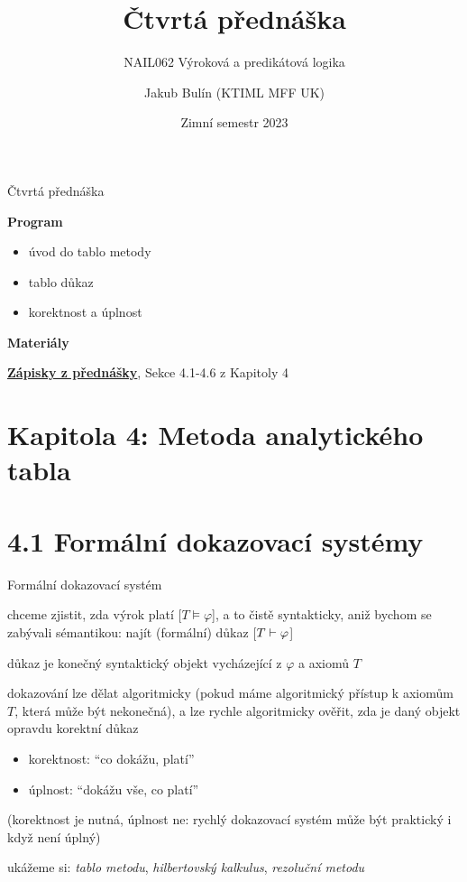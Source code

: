 \documentclass{beamer}
\title{Čtvrtá přednáška}
\subtitle{NAIL062 Výroková a predikátová logika}
\author{Jakub Bulín (KTIML MFF UK)}
\date{Zimní semestr 2023}
\begin{document}
\frame{\titlepage}


\begin{frame}{Čtvrtá přednáška}

    \textbf{Program}
        \begin{itemize}
            \item úvod do tablo metody
            \item tablo důkaz
            \item korektnost a úplnost
        \end{itemize}

    \textbf{Materiály}

        \href{https://github.com/jbulin-mff-uk/nail062/raw/main/lecture/lecture-notes/lecture-notes.pdf}{\alert{\textbf{Zápisky z přednášky}}}, Sekce 4.1-4.6 z Kapitoly 4

\end{frame}


\section{\sc Kapitola 4: Metoda analytického tabla}


\section{4.1 Formální dokazovací systémy}


\begin{frame}{Formální dokazovací systém}

    chceme zjistit, zda výrok platí [\alert{$T\models\varphi$}], a to čistě syntakticky, aniž bychom se zabývali sémantikou: najít \alert{(formální) důkaz} [\alert{$T\vdash\varphi$}]

    \alert{důkaz} je konečný syntaktický objekt vycházející z $\varphi$ a axiomů $T$

    dokazování lze dělat \alert{algoritmicky} (pokud máme algoritmický přístup k axiomům $T$, která může být nekonečná), a lze rychle algoritmicky \alert{ověřit}, zda je daný objekt opravdu korektní důkaz

    \begin{itemize}
        \item \alert{korektnost}: ``co dokážu, platí'' \hfill {}
        \item \alert{úplnost}: ``dokážu vše, co platí'' \hfill {}
    \end{itemize}
    (korektnost je nutná, úplnost ne: rychlý dokazovací systém může být praktický i když není úplný)

    ukážeme si: \emph{tablo metodu}, \emph{hilbertovský kalkulus}, \emph{rezoluční metodu}
    

\end{frame}
\end{document}
